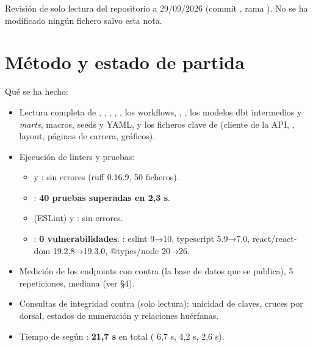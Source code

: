 Revisión de solo lectura del repositorio  a 29/09/2026 (commit , rama ). No se ha modificado ningún fichero salvo esta nota.

\section{Método y estado de partida}

Qué se ha hecho:

\begin{itemize}
\item Lectura completa de , , , , , los workflows, , , los modelos dbt intermedios y \emph{marts}, macros, seeds y YAML, y los ficheros clave de  (cliente de la API, , layout, páginas de carrera, gráficos).
\item Ejecución de linters y pruebas:
\begin{itemize}
\item {} y : sin errores (ruff 0.16.9, 50 ficheros).
\item {}: \textbf{40 pruebas superadas en 2,3 s}.
\item {} (ESLint) y : sin errores.
\item {}: \textbf{0 vulnerabilidades}. : eslint 9→10, typescript 5.9→7.0, react/react-dom 19.2.8→19.3.0, @types/node 20→26.
\end{itemize}
\item Medición de los endpoints con  contra  (la base de datos que se publica), 5 repeticiones, mediana (ver §4).
\item Consultas de integridad contra  (solo lectura): unicidad de claves, cruces por dorsal, estados de numeración y relaciones huérfanas.
\item Tiempo de  según : \textbf{21,7 s} en total ( 6,7 s,  4,2 s,  2,6 s).
\end{itemize}


